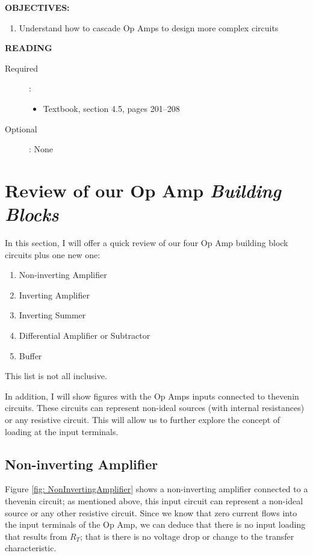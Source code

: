 \documentclass{handout}
\begin{document}
\maketitle

\textbf{OBJECTIVES:}
\begin{enumerate}
\item Understand how to cascade Op Amps to design more complex circuits
\end{enumerate}

\textbf{READING}
\begin{description}
\item [Required]:
\begin{itemize}
\item  Textbook, section 4.5, pages 201--208
\end{itemize}
\item [Optional]: None
\end{description}

\section{Review of our Op Amp {\em Building Blocks}}
In this section, I will offer a quick review of our four Op Amp building block circuits plus one new one:
\begin{enumerate}
\item Non-inverting Amplifier
\item Inverting Amplifier
\item Inverting Summer
\item Differential Amplifier or Subtractor
\item Buffer
\end{enumerate}

This list is not all inclusive.

In addition, I will show figures with the Op Amps inputs connected to thevenin circuits.  These circuits can represent non-ideal sources (with internal resistances) or any resistive circuit.  This will allow us to further explore the concept of loading at the input terminals.

\newpage
\clearpage
\pagebreak

\subsection{Non-inverting Amplifier}
Figure \ref{fig: NonInvertingAmplifier} shows a non-inverting amplifier connected to a thevenin circuit; as mentioned above, this input circuit can represent a non-ideal source or any other resistive circuit.  Since we know that zero current flows into the input terminals of the Op Amp, we can deduce that there is no input loading that results from $R_T$; that is there is no voltage drop or change to the transfer characteristic.
\end{document}
